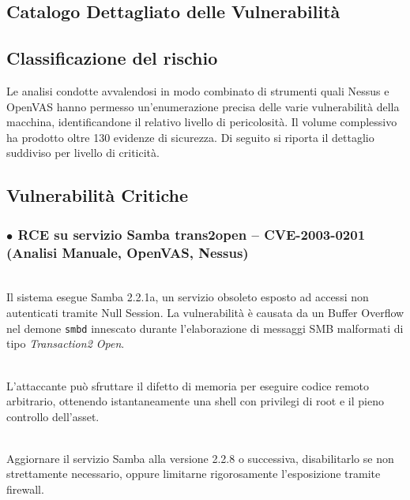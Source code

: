 \documentclass[12pt, a4paper]{article}
\begin{document}
	

	\subsection{{Catalogo Dettagliato delle Vulnerabilità}}

	\subsection*{\textbf{Classificazione del rischio}}
	Le analisi condotte avvalendosi in modo combinato di strumenti quali Nessus e OpenVAS hanno permesso un'enumerazione precisa delle varie vulnerabilità della macchina, identificandone il relativo livello di pericolosità. Il volume complessivo ha prodotto oltre 130 evidenze di sicurezza. Di seguito si riporta il dettaglio suddiviso per livello di criticità.

	\subsection{Vulnerabilità Critiche}

	\subsubsection{\textcolor{criticalred}{$\bullet$} RCE su servizio Samba trans2open -- CVE-2003-0201 (Analisi Manuale, OpenVAS, Nessus)}
	 \\ \vspace{0.2 cm}
	Il sistema esegue Samba 2.2.1a, un servizio obsoleto esposto ad accessi non autenticati tramite Null Session. La vulnerabilità è causata da un Buffer Overflow nel demone \texttt{smbd} innescato durante l'elaborazione di messaggi SMB malformati di tipo \emph{Transaction2 Open}.

	\vspace{0.2 cm}
	 \\ \vspace{0.2 cm}
	L'attaccante può sfruttare il difetto di memoria per eseguire codice remoto arbitrario, ottenendo istantaneamente una shell con privilegi di root e il pieno controllo dell'asset.

	\vspace{0.2 cm}
	 \\ \vspace{0.2 cm}
	Aggiornare il servizio Samba alla versione 2.2.8 o successiva, disabilitarlo se non strettamente necessario, oppure limitarne rigorosamente l'esposizione tramite firewall.
\end{document}
